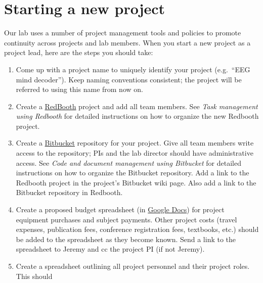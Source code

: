 \documentclass{tufte-book} %
\begin{document}
\section{Starting a new project}
Our lab uses a number of project management tools and policies to
promote continuity across projects and lab members.  When you start a
new project as a project lead, here are the steps you should
take:
\begin{enumerate}
\item Come up with a project name to uniquely identify your project
  (e.g.\ ``EEG mind decoder'').  Keep naming conventions
  consistent; the project will be referred to using this name from now on.
\item Create a
  \href{https://redbooth.com/}{RedBooth} project and add
  all team members.  See \textit{Task management using Redbooth} for
  detailed instructions on how to organize the new Redbooth project.
\item Create a \href{https://bitbucket.org/}{Bitbucket} repository for
  your project.  Give all team members write access to the repository;
  PIs and the lab director should have administrative access.  See
  \textit{Code and document management using Bitbucket} for detailed instructions on how to
  organize the Bitbucket repository.  Add a link to the Redbooth
  project in the project's Bitbucket wiki page.  Also add a link to
  the Bitbucket repository in Redbooth.
\item Create a proposed budget spreadsheet (in
  \href{https://docs.google.com/}{Google Docs}) for project equipment
  purchases and subject payments.  Other project costs (travel
  expenses, publication fees, conference registration fees, textbooks,
  etc.) should be added to the spreadsheet as they become known.  Send
  a link to the spreadsheet to Jeremy and cc the project PI (if not
  Jeremy).
\item Create a spreadsheet outlining all project personnel and their project roles.  This should

\end{enumerate}
\end{document}
